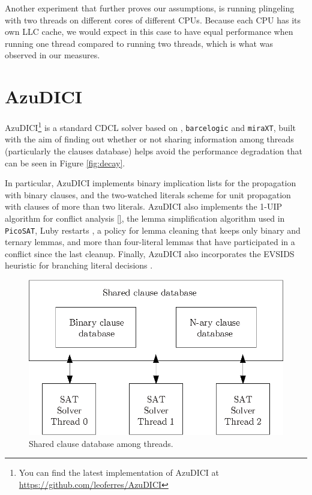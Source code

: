 \documentclass{llncs}
\begin{document}
Another experiment that further proves our assumptions, is running
plingeling with two threads on different cores of different
CPUs. Because each CPU has its own LLC cache, we would expect in this
case to have equal performance when running one thread compared to
running two threads, which is what was observed in our measures.

\section{AzuDICI}
\label{sec:azudici}

AzuDICI\footnote{You can find the latest implementation of AzuDICI at
  \url{https://github.com/leoferres/AzuDICI}} is a standard CDCL
solver based on \pling, {\tt barcelogic} and {\tt miraXT}, built with
the aim of finding out whether or not sharing information among
threads (particularly the clauses database) helps avoid the
performance degradation that can be seen in Figure \ref{fig:decay}.

In particular, AzuDICI implements binary implication lists for the
propagation with binary clauses, and the two-watched literals scheme
for unit propagation \cite{} with clauses of more than two
literals. AzuDICI also implements the 1-UIP algorithm for conflict
analysis \ref{}, the lemma simplification algorithm used in {\tt
  PicoSAT}, Luby restarts \cite{}, a policy for lemma cleaning that
keeps only binary and ternary lemmas, and more than four-literal
lemmas that have participated in a conflict since the last
cleanup. Finally, AzuDICI also incorporates the EVSIDS heuristic for
branching literal decisions \cite{}.


\begin{figure}[tp]
  \centering
  \includegraphics[scale=0.7]{AzuDICI_database}
  \caption{Shared clause database among threads.}
  \label{fig:azu database}
\end{figure}
\end{document}
